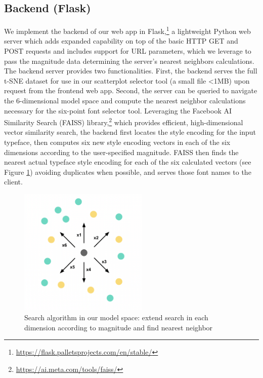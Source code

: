 \subsection{Backend (Flask)}

We implement the backend of our web app in Flask,\footnote{\url{https://flask.palletsprojects.com/en/stable/}} a lightweight Python web server which adds expanded capability on top of the basic HTTP GET and POST requests and includes support for URL parameters, which we leverage to pass the magnitude data determining the server's nearest neighbors calculations. The backend server provides two functionalities. First, the backend serves the full t-SNE dataset for use in our scatterplot selector tool (a small file <1MB) upon request from the frontend web app. Second, the server can be queried to navigate the 6-dimensional model space and compute the nearest neighbor calculations necessary for the six-point font selector tool. Leveraging the Facebook AI Similarity Search (FAISS) library,\footnote{\url{https://ai.meta.com/tools/faiss/}} which provides efficient, high-dimensional vector similarity search, the backend first locates the style encoding for the input typeface, then computes six new style encoding vectors in each of the six dimensions according to the user-specified magnitude. FAISS then finds the nearest actual typeface style encoding for each of the six calculated vectors (see Figure \ref{fig:model-search}) avoiding duplicates when possible, and serves those font names to the client.

\begin{figure}[]
    \centering
    \includegraphics[width=0.55\textwidth]{images/model-search.png}
    \caption{Search algorithm in our model space: extend search in each dimension according to magnitude and find nearest neighbor}
    \label{fig:model-search}
\end{figure}

